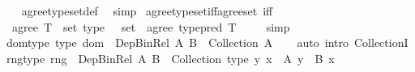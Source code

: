 \begin{isabellebody}
%
\isadelimproof
\ \ %
\endisadelimproof
%
\isatagproof
{}\isamarkupfalse%
\ agree{\isacharunderscore}{\kern0pt}type{\isacharunderscore}{\kern0pt}set{\isacharunderscore}{\kern0pt}def\ \isamarkupfalse%
\ simp%
\endisatagproof
{\isafoldproof}%
%
\isadelimproof
\isanewline
%
\endisadelimproof
\isanewline
{}\isamarkupfalse%
\ agree{\isacharunderscore}{\kern0pt}type{\isacharunderscore}{\kern0pt}set{\isacharunderscore}{\kern0pt}iff{\isacharunderscore}{\kern0pt}agree{\isacharunderscore}{\kern0pt}set\ {\isacharbrackleft}{\kern0pt}iff{\isacharbrackright}{\kern0pt}{\isacharcolon}{\kern0pt}\isanewline
\ \ {\isachardoublequoteopen}agree\ {\isacharparenleft}{\kern0pt}T\ {\isacharcolon}{\kern0pt}{\isacharcolon}{\kern0pt}\ set\ type{\isacharparenright}{\kern0pt}\ {\isacharparenleft}{\kern0pt}{\isasymR}\ {\isacharcolon}{\kern0pt}{\isacharcolon}{\kern0pt}\ set{\isacharparenright}{\kern0pt}\ {\isasymlongleftrightarrow}\ agree\ {\isacharparenleft}{\kern0pt}type{\isacharunderscore}{\kern0pt}pred\ T{\isacharparenright}{\kern0pt}\ {\isasymR}{\isachardoublequoteclose}\isanewline
%
\isadelimproof
\ \ %
\endisadelimproof
%
\isatagproof
{}\isamarkupfalse%
\ simp%
\endisatagproof
{\isafoldproof}%
%
\isadelimproof
\isanewline
%
\endisadelimproof
\isanewline
{}\isamarkupfalse%
\ dom{\isacharunderscore}{\kern0pt}type\ {\isacharbrackleft}{\kern0pt}type{\isacharbrackright}{\kern0pt}{\isacharcolon}{\kern0pt}\ {\isachardoublequoteopen}dom\ {\isacharcolon}{\kern0pt}\ Dep{\isacharunderscore}{\kern0pt}Bin{\isacharunderscore}{\kern0pt}Rel\ A\ B\ {\isasymRightarrow}\ Collection\ A{\isachardoublequoteclose}\isanewline
%
\isadelimproof
\ \ %
\endisadelimproof
%
\isatagproof
{}\isamarkupfalse%
\ {\isacharparenleft}{\kern0pt}auto\ intro{\isacharcolon}{\kern0pt}\ CollectionI{\isacharparenright}{\kern0pt}%
\endisatagproof
{\isafoldproof}%
%
\isadelimproof
\isanewline
%
\endisadelimproof
\isanewline
{}\isamarkupfalse%
\ rng{\isacharunderscore}{\kern0pt}type{\isacharcolon}{\kern0pt}\ {\isachardoublequoteopen}rng\ {\isacharcolon}{\kern0pt}\ Dep{\isacharunderscore}{\kern0pt}Bin{\isacharunderscore}{\kern0pt}Rel\ A\ B\ {\isasymRightarrow}\ Collection\ {\isacharparenleft}{\kern0pt}type\ {\isacharparenleft}{\kern0pt}{\isasymlambda}y{\isachardot}{\kern0pt}\ {\isasymexists}x\ {\isacharcolon}{\kern0pt}\ A{\isachardot}{\kern0pt}\ y\ {\isacharcolon}{\kern0pt}\ B\ x{\isacharparenright}{\kern0pt}{\isacharparenright}{\kern0pt}{\isachardoublequoteclose}\isanewline
%
\isadelimproof
\ \ %
\endisadelimproof
%
\isatagproof

\end{isabellebody}
